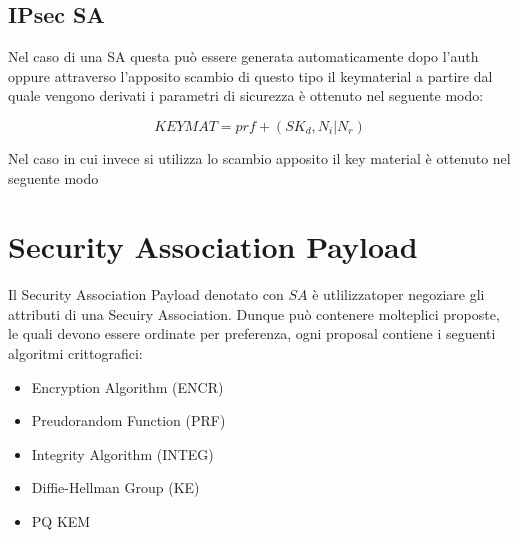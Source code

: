 \subsection{IPsec SA}

Nel caso di una SA questa può essere generata automaticamente dopo l'auth oppure attraverso l'apposito scambio di questo tipo il keymaterial a partire dal quale vengono derivati i parametri di sicurezza è ottenuto nel seguente modo:

$$KEYMAT=prf+(SK_d,  N_i|N_r)$$

Nel caso in cui invece si utilizza lo scambio apposito il key material è ottenuto nel seguente modo


\section{Security Association Payload}

Il Security Association Payload denotato con $SA$ è utlilizzatoper negoziare gli attributi di una Secuiry Association. 
Dunque può contenere molteplici proposte, le quali devono essere ordinate per preferenza, ogni proposal contiene i seguenti algoritmi crittografici:

\begin{itemize}
    \item Encryption Algorithm (ENCR)
    \item Preudorandom Function (PRF)
    \item Integrity Algorithm (INTEG)
    \item Diffie-Hellman Group (KE)
    \item PQ KEM 
\end{itemize}
